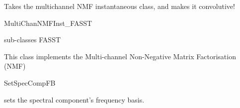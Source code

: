 \documentclass[letterpaper,10pt,english]{sphinxmanual}
\begin{document}

\begin{fulllineitems}
\label{reference/audiomodel:pyfasst.audioModel.MultiChanNMFConv}
Takes the multichannel NMF instantaneous class, and makes it
convolutive!

\end{fulllineitems}


\begin{fulllineitems}
\label{reference/audiomodel:pyfasst.audioModel.MultiChanNMFInst_FASST}
MultiChanNMFInst\_FASST

sub-classes FASST

This class implements the Multi-channel Non-Negative Matrix Factorisation
(NMF)

\begin{fulllineitems}
\label{reference/audiomodel:pyfasst.audioModel.MultiChanNMFInst_FASST.setSpecCompFB}
SetSpecCompFB

sets the spectral component's frequency basis.

\end{fulllineitems}


\end{fulllineitems}

\end{document}
